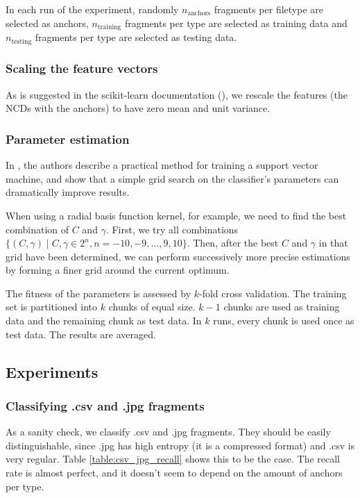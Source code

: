In each run of the experiment, randomly $n_{\text{anchors}}$ fragments per
filetype are selected as anchors, $n_{\text{training}}$ fragments per type are
selected as training data and $n_{\text{testing}}$ fragments per type are
selected as testing data.

\subsubsection{Scaling the feature vectors}

As is suggested in the scikit-learn documentation (\cite{Pedregosa2011}),
we rescale the features (the NCDs with the anchors) to have zero mean and
unit variance.


\subsubsection{Parameter estimation}

In \cite{Chih2008}, the authors describe a practical method for training
a support vector machine, and show that a simple grid search on the
classifier's parameters can dramatically improve results.

When using a radial basis function kernel, for example, we need to find
the best combination of $C$ and $\gamma$. First, we try all combinations
$ \{ (C, \gamma) \mid C, \gamma \in 2^{n}, n = -10, -9, \dots, 9, 10 \}$.
Then, after the best $C$ and $\gamma$ in that grid have been determined,
we can perform successively more precise estimations by forming a finer
grid around the current optimum.

The fitness of the parameters is assessed by $k$-fold cross validation.
The training set is partitioned into $k$ chunks of equal size. $k - 1$
chunks are used as training data and the remaining chunk as test data. In
$k$ runs, every chunk is used once as test data. The results are averaged.

\subsection{Experiments}

\subsubsection{Classifying .csv and .jpg fragments}

As a sanity check, we classify .csv and .jpg fragments. They should be
easily distinguishable, since .jpg has high entropy (it is a compressed
format) and .csv is very regular. Table \ref{table:csv_jpg_recall} shows
this to be the case. The recall rate is almost perfect, and it doesn't
seem to depend on the amount of anchors per type.

